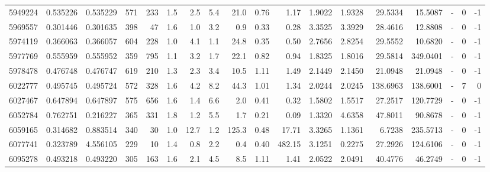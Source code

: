 \begin{tabular}{rrrrrrrrrrrrrrrlrr}
   5949224 & 0.535226 &   0.535229 &  571 &  233 &      1.5 &      2.5 &     5.4 &     21.0 &       0.76 &        1.17 &  1.9022 &  1.9328 &   29.5334 &   15.5087 &             - &        0 &         -1 \\
   5969557 & 0.301446 &   0.301635 &  398 &   47 &      1.6 &      1.0 &     3.2 &      0.9 &       0.33 &        0.28 &  3.3525 &  3.3929 &   28.4616 &   12.8808 &             - &        0 &         -1 \\
   5974119 & 0.366063 &   0.366057 &  604 &  228 &      1.0 &      4.1 &     1.1 &     24.8 &       0.35 &        0.50 &  2.7656 &  2.8254 &   29.5552 &   10.6820 &             - &        0 &         -1 \\
   5977769 & 0.555959 &   0.555952 &  359 &  795 &      1.1 &      3.2 &     1.7 &     22.1 &       0.82 &        0.94 &  1.8325 &  1.8016 &   29.5814 &  349.0401 &             - &        0 &         -1 \\
   5978478 & 0.476748 &   0.476747 &  619 &  210 &      1.3 &      2.3 &     3.4 &     10.5 &       1.11 &        1.49 &  2.1449 &  2.1450 &   21.0948 &   21.0948 &             - &        0 &         -1 \\
   6022777 & 0.495745 &   0.495724 &  572 &  328 &      1.6 &      4.2 &     8.2 &     44.3 &       1.01 &        1.34 &  2.0244 &  2.0245 &  138.6963 &  138.6001 &             - &        7 &          0 \\
   6027467 & 0.647894 &   0.647897 &  575 &  656 &      1.6 &      1.4 &     6.6 &      2.0 &       0.41 &        0.32 &  1.5802 &  1.5517 &   27.2517 &  120.7729 &             - &        0 &         -1 \\
   6052784 & 0.762751 &   0.216227 &  365 &  331 &      1.8 &      1.2 &     5.5 &      1.7 &       0.21 &        0.09 &  1.3320 &  4.6358 &   47.8011 &   90.8678 &             - &        0 &         -1 \\
   6059165 & 0.314682 &   0.883514 &  340 &   30 &      1.0 &     12.7 &     1.2 &    125.3 &       0.48 &       17.71 &  3.3265 &  1.1361 &    6.7238 &  235.5713 &             - &        0 &         -1 \\
   6077741 & 0.323789 &   4.556105 &  229 &   10 &      1.4 &      0.8 &     2.2 &      0.4 &       0.40 &      482.15 &  3.1251 &  0.2275 &   27.2926 &  124.6106 &             - &        0 &         -1 \\
   6095278 & 0.493218 &   0.493220 &  305 &  163 &      1.6 &      2.1 &     4.5 &      8.5 &       1.11 &        1.41 &  2.0522 &  2.0491 &   40.4776 &   46.2749 &             - &        0 &         -1 \\

\end{tabular}

